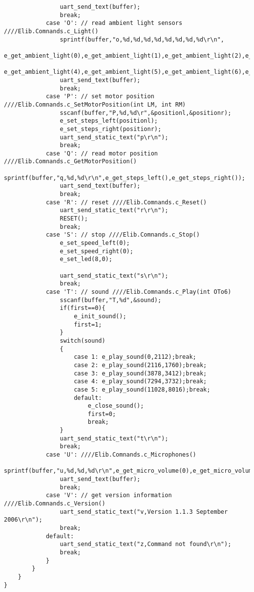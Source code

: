 \begin{lstlisting}
				uart_send_text(buffer);
				break;
			case 'O': // read ambient light sensors ////Elib.Comnands.c_Light()
				sprintf(buffer,"o,%d,%d,%d,%d,%d,%d,%d,%d\r\n",
				        e_get_ambient_light(0),e_get_ambient_light(1),e_get_ambient_light(2),e_get_ambient_light(3),
				        e_get_ambient_light(4),e_get_ambient_light(5),e_get_ambient_light(6),e_get_ambient_light(7));
				uart_send_text(buffer);
				break;
			case 'P': // set motor position ////Elib.Comnands.c_SetMotorPosition(int LM, int RM)
				sscanf(buffer,"P,%d,%d\r",&positionl,&positionr);
				e_set_steps_left(positionl);
				e_set_steps_right(positionr);
				uart_send_static_text("p\r\n");
				break;
			case 'Q': // read motor position ////Elib.Comnands.c_GetMotorPosition()
				sprintf(buffer,"q,%d,%d\r\n",e_get_steps_left(),e_get_steps_right());
				uart_send_text(buffer);
				break;
			case 'R': // reset ////Elib.Comnands.c_Reset()
				uart_send_static_text("r\r\n");
				RESET();
				break;
			case 'S': // stop ////Elib.Comnands.c_Stop()
				e_set_speed_left(0);
				e_set_speed_right(0);
				e_set_led(8,0);
				
				uart_send_static_text("s\r\n");
				break;
			case 'T': // sound ////Elib.Comnands.c_Play(int OTo6)
				sscanf(buffer,"T,%d",&sound);
				if(first==0){
					e_init_sound();
					first=1;
				}
				switch(sound)
				{
					case 1: e_play_sound(0,2112);break;
					case 2: e_play_sound(2116,1760);break;
					case 3: e_play_sound(3878,3412);break;
					case 4: e_play_sound(7294,3732);break;
					case 5: e_play_sound(11028,8016);break;
					default:
						e_close_sound();
						first=0;
						break;
				}		
				uart_send_static_text("t\r\n");
				break;
			case 'U': ////Elib.Comnands.c_Microphones()
				sprintf(buffer,"u,%d,%d,%d\r\n",e_get_micro_volume(0),e_get_micro_volume(1),e_get_micro_volume(2));
				uart_send_text(buffer);
				break;
			case 'V': // get version information ////Elib.Comnands.c_Version()
				uart_send_static_text("v,Version 1.1.3 September 2006\r\n");
				break;
			default:
				uart_send_static_text("z,Command not found\r\n");
				break;
			}
		}
	}
}
\end{lstlisting}
